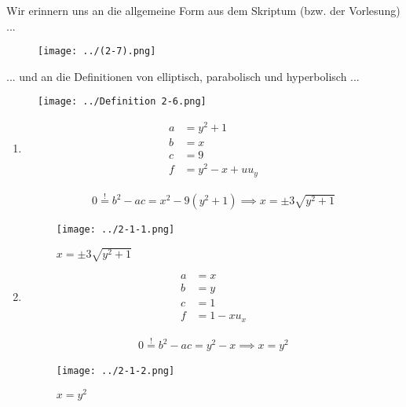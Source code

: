 \begin{solution}

Wir erinnern uns an die allgemeine Form aus dem Skriptum (bzw. der Vorlesung) ...

\begin{figure}[h!]
    \centering
    \texttt{[image: ../(2-7).png]}
\end{figure}

... und an die Definitionen von elliptisch, parabolisch und hyperbolisch ...

\begin{figure}[h!]
    \centering
    \texttt{[image: ../Definition 2-6.png]}
\end{figure}

\begin{enumerate}[label = (\roman*)]

    \item

    \begin{align*}
        a & = y^2 + 1 \\
        b & = x \\
        c & = 9 \\
        f & = y^2 - x + u u_y
    \end{align*}

    \begin{align*}
        0 \stackrel{!}{=}
        b^2 - ac
        =
        x^2 - 9 (y^2 + 1)
        \implies
        x = \pm 3 \sqrt{y^2 + 1}
    \end{align*}

    \begin{figure}[h!]
        \centering
        \texttt{[image: ../2-1-1.png]}
        \caption{$x = \pm 3 \sqrt{y^2 + 1}$}
    \end{figure}

    \item

    \begin{align*}
        a & = x \\
        b & = y \\
        c & = 1 \\
        f & = 1 - x u_x
    \end{align*}

    \begin{align*}
        0 \stackrel{!}{=}
        b^2 - ac
        =
        y^2 - x
        \implies
        x = y^2
    \end{align*}

    \begin{figure}[h!]
        \centering
        \texttt{[image: ../2-1-2.png]}
        \caption{$x = y^2$}
    \end{figure}

\end{enumerate}

\FloatBarrier
\end{solution}

